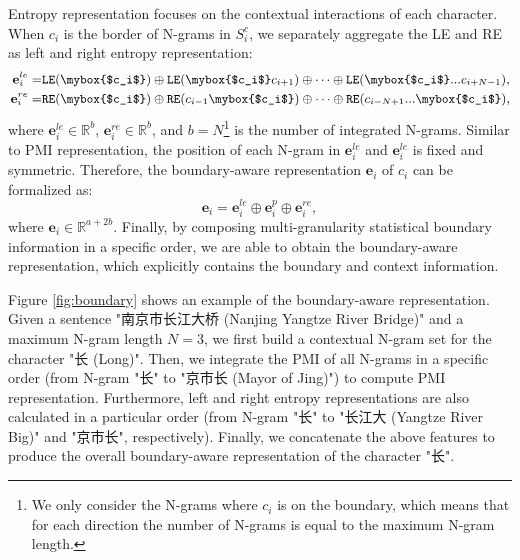 \documentclass[11pt]{article}
\begin{document}
\begin{CJK}{UTF8}{gbsn}
Entropy representation focuses on the contextual interactions of each character.
When $c_i$ is the border of N-grams in $S^{c}_i$,
we separately aggregate the LE and RE as left and right entropy representation:
\begin{equation}
  \small
  \begin{split}
    \mathbf{e}_i^{le} =& \texttt{LE}(\mybox{$c_i$}) \oplus \texttt{LE}(\mybox{$c_i$}c_{i+1}) \oplus \cdots \oplus \texttt{LE}(\mybox{$c_i$}...c_{i+N-1}),\\
    \mathbf{e}_i^{re} =& \texttt{RE}(\mybox{$c_i$}) \oplus \texttt{RE}(c_{i-1}\mybox{$c_i$}) \oplus \cdots \oplus \texttt{RE}(c_{i-N+1}...\mybox{$c_i$}),
  \end{split}
\end{equation}
where $\mathbf{e}_i^{le} \in \mathbb{R}^{b}$, $\mathbf{e}_i^{re} \in \mathbb{R}^{b}$, and $b = N$\footnote{We only consider the N-grams where $c_i$ is on the boundary, which means that for each direction the number of N-grams is equal to the maximum N-gram length.}
is the number of integrated N-grams.
Similar to PMI representation, the position of each N-gram in $\mathbf{e}_i^{le}$ and $\mathbf{e}_i^{le}$ is fixed and symmetric.
Therefore, the boundary-aware representation $\mathbf{e}_i$ of $c_i$ can be formalized as:
\begin{equation}
  \label{eq:boundary}
  \mathbf{e}_i = \mathbf{e}_i^{le} \oplus \mathbf{e}_i^{p} \oplus \mathbf{e}_i^{re},
\end{equation}
where $\mathbf{e}_i \in \mathbb{R}^{a + 2b}$.
Finally, by composing multi-granularity statistical boundary information in a specific order,
we are able to obtain the boundary-aware representation,
which explicitly contains the boundary and context information.

Figure \ref{fig:boundary} shows an example of the boundary-aware representation.
Given a sentence "南京市长江大桥 (Nanjing Yangtze River Bridge)" and a maximum N-gram length $N = 3$,
we first build a contextual N-gram set for the character "长 (Long)".
Then, we integrate the PMI of all N-grams in a specific order (from N-gram "长" to "京市长 (Mayor of Jing)") to compute PMI representation. Furthermore, left and right entropy representations are also calculated in a particular order (from N-gram "长" to "长江大  (Yangtze River Big)" and "京市长", respectively).
Finally, we concatenate the above features to produce the overall boundary-aware representation of the character "长".




\end{CJK}
\end{document}
